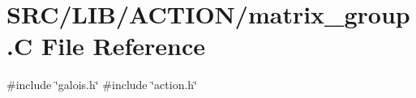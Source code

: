 \hypertarget{matrix__group_8_c}{}\section{S\+R\+C/\+L\+I\+B/\+A\+C\+T\+I\+O\+N/matrix\+\_\+group.C File Reference}
\label{matrix__group_8_c}
{\ttfamily \#include \char`\"{}galois.\+h\char`\"{}}\newline
{\ttfamily \#include \char`\"{}action.\+h\char`\"{}}\newline
